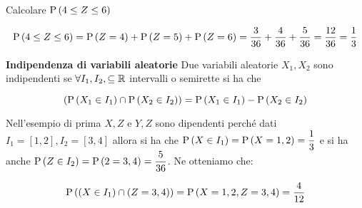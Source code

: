 \begin{exmp}
    Calcolare $ \text{P}\left(4 \leq Z \leq 6\right) $
    
    \begin{equation*}
    \text{P}\left(4 \leq Z \leq 6\right) = \text{P}\left(Z = 4\right) + \text{P}\left(Z = 5\right) + \text{P}\left(Z = 6\right) = \dfrac{3}{36} + \dfrac{4}{36} + \dfrac{5}{36} = \dfrac{12}{36} = \dfrac{1}{3}
    \end{equation*}
\end{exmp}		


\begin{defn}
    \textbf{Indipendenza di variabili aleatorie}
    Due variabili aleatorie $ X_1, X_2 $ sono indipendenti se $ \forall I_1, I_2, \subseteq \mathbb{R} $ intervalli o semirette si ha che 
    
    \begin{equation*}
    \left( \text{P}\left(X_1 \in I_1\right) \cap \text{P}\left(X_2 \in I_2\right) \right) = \text{P}\left(X_1 \in I_1\right) - \text{P}\left(X_2 \in I_2\right)
    \end{equation*}
    
    Nell'esempio di prima $ X, Z $ e $ Y,Z $ sono dipendenti perché dati $ I_1 = [1,2], I_2 = [3,4] $ allora si ha che $ \text{P}\left(X\in I_1\right) = \text{P}\left(X=1,2\right) = \dfrac{1}{3} $ e si ha anche $ \text{P}\left(Z \in I_2\right) = \text{P}\left(2 = 3,4\right) = \dfrac{5}{36} $. Ne otteniamo che:
    
    
    \begin{equation*}
    \text{P}\left((X \in I_1) \cap (Z = 3,4)\right) = \text{P}\left(X = 1,2, Z = 3,4\right) = \dfrac{4}{12}
    \end{equation*}

\end{defn}


